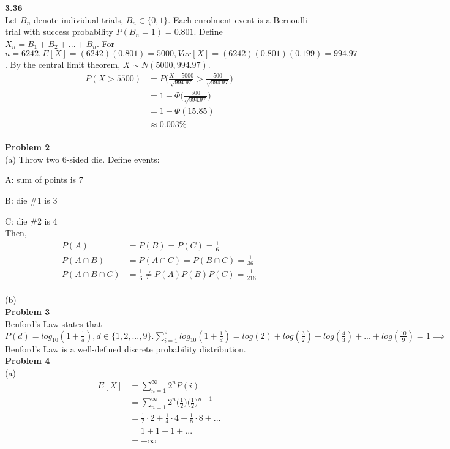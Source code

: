 \documentclass[letterpaper,12pt]{article}
\theoremstyle{definition}
\begin{document}
\noindent\textbf{3.36}\\
\noindent Let $B_n$ denote individual trials, $B_n \in \{0, 1\}$. Each enrolment event is a Bernoulli trial with success probability $P(B_n = 1) = 0.801$. Define $X_n = B_1 + B_2 + ... + B_n$. For $n = 6242, E[X] = (6242)(0.801) = 5000, Var[X] = (6242)(0.801)(0.199) = 994.97$. By the central limit theorem, $X \sim N(5000, 994.97)$. 
\begin{align*}
P(X > 5500) &= P\Bigg(\frac{X-5000}{\sqrt{994.97}} > \frac{500}{\sqrt{994.97}}\Bigg)\\
&= 1 - \Phi\Bigg(\frac{500}{\sqrt{994.97}}\Bigg)\\
&= 1 - \Phi(15.85)\\
&\approx 0.003\%
\end{align*}\newline\\
\noindent\textbf{Problem 2}\\
\noindent (a) Throw two 6-sided die. Define events:\par
A: sum of points is 7\par
B: die \#1 is 3\par
C: die \#2 is 4\\
Then,
\begin{align*}
P(A) &= P(B) = P(C) = \frac{1}{6}\\
P(A \cap B) &= P(A \cap C) = P(B \cap C) = \frac{1}{36}\\
P(A \cap B \cap C) &= \frac{1}{6} \ne P(A)P(B)P(C) = \frac{1}{216}
\end{align*}\\
(b)\newline\\
\noindent\textbf{Problem 3}\\
Benford's Law states that $P(d) = log_{10}(1+\frac{1}{d}), d \in \{1, 2, ... , 9\}. \sum_{i=1}^{9}log_{10}(1+\frac{1}{d}) = log(2) + log(\frac{3}{2}) + log(\frac{4}{3}) + ... + log(\frac{10}{9}) = 1 \implies$ Benford's Law is a well-defined discrete probability distribution.\newline\\
\noindent\textbf{Problem 4}\\
(a) \begin{align*}
E[X] &= \sum_{n=1}^{\infty}2^nP(i)\\
&= \sum_{n=1}^{\infty}2^n\Big(\frac{1}{2}\Big)\Big(\frac{1}{2}\Big)^{n-1}\\
&= \frac{1}{2}\cdot2+\frac{1}{4}\cdot4+\frac{1}{8}\cdot8+...\\
&= 1+1+1+...\\
&=+\infty
\end{align*}\\
\end{document}
